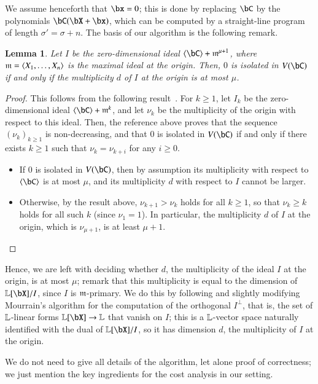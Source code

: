 \documentclass[amsthm]{elsart}
\newtheorem{lemma}[definition]{Lemma}
\begin{document}
We assume henceforth that $\bx=0$; this is done by replacing $\bC$ by
the polynomials $\bC(\bX+\bx)$, which can be computed by a
straight-line program of length $\sigma'=\sigma+n$.  The basis of our
algorithm is the following remark.

\begin{lemma}
  Let $I$ be the zero-dimensional ideal
  $\langle \bC \rangle + \m^{\mu+1}$, where
  $\mathfrak{m}=\langle X_1,\dots,X_n\rangle$ is the maximal ideal at the
  origin. Then, $0$ is isolated in $V(\bC)$ if and only if the
  multiplicity $d$ of $I$ at the origin is at most $\mu$.
\end{lemma}
\begin{proof}
  This follows from the following
  result~\cite[Theorem~A.1]{BaHaPeSo09}.  For $k \ge 1$, let $I_k$ be
  the zero-dimensional ideal $\langle \bC \rangle + \m^{k}$, and let
  $\nu_k$ be the multiplicity of the origin with respect to this
  ideal. Then, the reference above proves that the sequence
  $(\nu_k)_{k \ge 1}$ is non-decreasing, and that $0$ is isolated in
  $V(\bC)$ if and only if there exists $k\ge 1$ such that
  $\nu_k=\nu_{k+i}$ for any $i\geq 0$.
  \begin{itemize}
  \item If $0$ is isolated in $V(\bC)$, then by assumption 
    its multiplicity with respect to $\langle \bC\rangle$ is at most $\mu$,
    and its multiplicity $d$ with respect to $I$ cannot be larger.
  \item Otherwise, by the result above, $\nu_{k+1} > \nu_k$ holds for
    all $k \ge 1$, so that $\nu_k \ge k$ holds for all such $k$ (since
    $\nu_1=1$). In particular, the multiplicity $d$ of 
 $I$ at the origin, which is $\nu_{\mu+1}$, is at least $\mu+1$.
    \qedhere
  \end{itemize}
\end{proof}

Hence, we are left with deciding whether $d$, the multiplicity of the
ideal $I$ at the origin, is at most $\mu$; remark that this
multiplicity is equal to the dimension of $\LL[\bX]/I$, since $I$ is
$\mathfrak{m}$-primary.  We do this by following and slightly modifying
Mourrain's algorithm for the computation of the orthogonal
$I^{\perp}$, that is, the set of $\mathbb{L}$-linear forms $\LL[\bX] \to \LL$
that vanish on $I$; this is a $\mathbb{L}$-vector space naturally identified
with the dual of $\LL[\bX]/I$, so it has dimension $d$, the
multiplicity of $I$ at the origin.

We do not need to give all details of the algorithm, let alone proof
of correctness; we just mention the key ingredients for the cost
analysis in our setting. 
\end{document}
